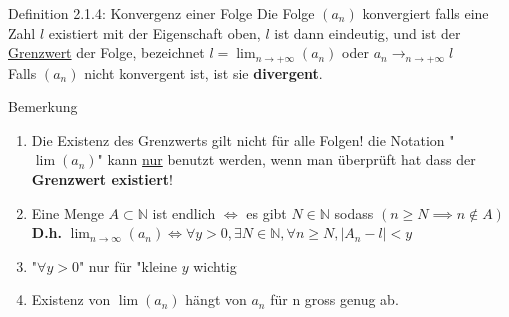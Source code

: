 \documentclass[a4paper,10pt]{article}
\begin{document}
\begin{defbox}{Definition 2.1.4: Konvergenz einer Folge}
Die Folge $(a_n)$ konvergiert falls eine Zahl $l$ existiert mit der Eigenschaft oben, $l$ ist dann eindeutig, und ist der \underline{Grenzwert} der Folge, bezeichnet 
$l=\lim_{n\to +\infty}(a_n)$ oder $a_n\longrightarrow_{n\to +\infty} l$\\
Falls $(a_n)$ nicht konvergent ist, ist sie \textbf{divergent}.
\end{defbox}

\begin{bembox}{Bemerkung}
\begin{enumerate}
    \item Die Existenz des Grenzwerts gilt nicht für alle Folgen! die Notation "$\lim(a_n)$" kann \underline{nur} benutzt werden, wenn man überprüft hat dass der \textbf{Grenzwert existiert}!
    \item Eine Menge $ A  \subset \mathbb{N}$ ist endlich $\iff$ es gibt $N\in \mathbb{N}$ sodass $ (n\ge N \implies n\notin A) $\\
    \textbf{D.h.} $\lim_{n\to\infty}(a_n)\iff\forall y >0, \exists N \in \mathbb{N}, \forall n \ge N, |A_n-l|< y$ 
    \item "$\forall y > 0 $" nur für "kleine $y$ wichtig
    \item Existenz von $\lim(a_n)$ hängt von $a_n$ für n gross genug ab.
\end{enumerate}
\end{bembox}
\end{document}
